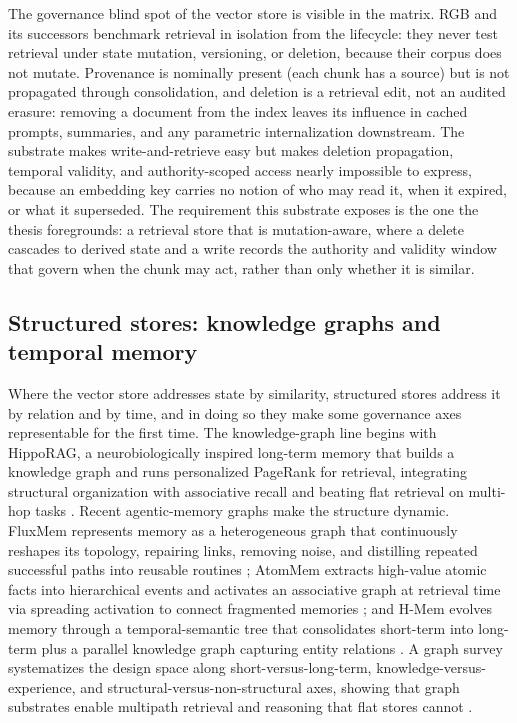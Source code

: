 The governance blind spot of the vector store is visible in the matrix. RGB and its successors benchmark retrieval in isolation from the lifecycle: they never test retrieval under state mutation, versioning, or deletion, because their corpus does not mutate. Provenance is nominally present (each chunk has a source) but is not propagated through consolidation, and deletion is a retrieval edit, not an audited erasure: removing a document from the index leaves its influence in cached prompts, summaries, and any parametric internalization downstream. The substrate makes write-and-retrieve easy but makes deletion propagation, temporal validity, and authority-scoped access nearly impossible to express, because an embedding key carries no notion of who may read it, when it expired, or what it superseded. The requirement this substrate exposes is the one the thesis foregrounds: a retrieval store that is mutation-aware, where a delete cascades to derived state and a write records the authority and validity window that govern when the chunk may act, rather than only whether it is similar.

\subsection{Structured stores: knowledge graphs and temporal memory}

Where the vector store addresses state by similarity, structured stores address it by relation and by time, and in doing so they make some governance axes representable for the first time. The knowledge-graph line begins with HippoRAG, a neurobiologically inspired long-term memory that builds a knowledge graph and runs personalized PageRank for retrieval, integrating structural organization with associative recall and beating flat retrieval on multi-hop tasks \citep{gutierrez2024hipporag}. Recent agentic-memory graphs make the structure dynamic. FluxMem represents memory as a heterogeneous graph that continuously reshapes its topology, repairing links, removing noise, and distilling repeated successful paths into reusable routines \citep{fang2026fluxmem}; AtomMem extracts high-value atomic facts into hierarchical events and activates an associative graph at retrieval time via spreading activation to connect fragmented memories \citep{yao2026atommem}; and H-Mem evolves memory through a temporal-semantic tree that consolidates short-term into long-term plus a parallel knowledge graph capturing entity relations \citep{yu2026hmem}. A graph survey systematizes the design space along short-versus-long-term, knowledge-versus-experience, and structural-versus-non-structural axes, showing that graph substrates enable multipath retrieval and reasoning that flat stores cannot \citep{yang2026graphagentmemorysurvey}.

